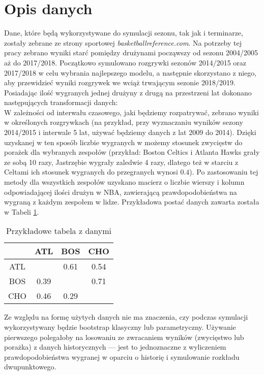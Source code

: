 \documentclass[inzynierska]{pwr_wmat_praca_dyplomowa}
\theoremstyle{plain}
\numberwithin{theorem}{chapter}
\theoremstyle{definition}
\numberwithin{theorem}{chapter}
\begin{document}
\section{Opis danych}
Dane, które będą wykorzystywane do symulacji sezonu, tak jak i terminarze, zostały zebrane ze strony sportowej \textit{basketballreference.com}. \cite{dane}
Na potrzeby tej pracy zebrano wyniki starć pomiędzy drużynami począwszy od sezonu 2004/2005 aż do 2017/2018. Początkowo symulowano rozgrywki sezonów 2014/2015 oraz 2017/2018 w celu wybrania najlepszego modelu, a następnie skorzystano z niego, aby przewidzieć wyniki rozgrywek we wciąż trwającym sezonie 2018/2019.
Posiadając ilość wygranych jednej drużyny z drugą na przestrzeni lat dokonano następujących transformacji danych:
\\
W zależności od interwału czasowego, jaki będziemy rozpatrywać, zebrano wyniki w określonych rozgrywkach (na przykład, przy wyznaczaniu wyników sezony 2014/2015 i interwale 5 lat, używać będziemy danych z lat 2009 do 2014). Dzięki uzyskanej w ten sposób liczbie wygranych w możemy stosunek zwycięstw do porażek dla wybranych zespołów (przykład: Boston Celtics i Atlanta Hawks grały ze sobą 10 razy, Jastrzębie wygrały zaledwie 4 razy, dlatego też w starciu z Celtami ich stosunek wygranych do przegranych wynosi $0.4$). Po zastosowaniu tej metody dla wszystkich zespołów uzyskano macierz o liczbie wierszy i kolumn odpowiadającej ilości drużyn w NBA, zawierającą prawdopodobieństwa na wygraną z każdym zespołem w lidze. Przykładowa postać danych zawarta została w Tabeli \ref{dane_tabela}.
\begin{table}[]
	\centering
	\begin{tabular}{|c|c|c|c|}
		\hline
		&ATL & BOS & CHO\\ \hline
		ATL &  & 0.61&0.54\\ \hline
		BOS & 0.39 & &0.71\\ \hline
		CHO & 0.46 & 0.29&\\ \hline
	\end{tabular}
	\caption{Przykładowe tabela z danymi}\label{dane_tabela}	
\end{table}

Ze względu na formę użytych danych nie ma znaczenia, czy podczas symulacji wykorzystywany będzie bootstrap klasyczny lub parametryczny. Używanie pierwszego polegałoby na losowaniu ze zwracaniem wyników (zwycięstwo lub porażka) z danych historycznych --- jest to jednoznaczne z wyliczeniem prawdopodobieństwa wygranej w oparciu o historię i symulowanie rozkładu dwupunktowego.
\end{document}
